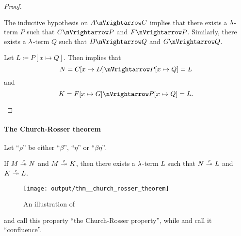 \begin{proof}
\begin{itemize}
\begin{itemize}
      The inductive hypothesis on \( A \pred C \) implies that there exists a \( \mathrm{\lambda} \)-term \( P \) such that \( C \pred P \) and \( F \pred P \). Similarly, there exists a \( \mathrm{\lambda} \)-term \( Q \) such that \( D \pred Q \) and \( G \pred Q \).

      Let \( L \coloneqq P[x \mapsto Q] \). Then  implies that
      \begin{equation*}
        N = C[x \mapsto D] \pred P[x \mapsto Q] = L
      \end{equation*}
      and
      \begin{equation*}
        K = F[x \mapsto G] \pred P[x \mapsto Q] = L.
      \end{equation*}
    \end{itemize}
  \end{itemize}
\end{proof}

\paragraph{The Church-Rosser theorem}

\begin{theorem}\label{thm:church_rosser_theorem}
  Let \enquote{\( \rho \)} be either \enquote{\( \beta \)}, \enquote{\( \eta \)} or \enquote{\( \beta\eta \)}.

  If \( M \rred* N \) and \( M \rred* K \), then there exists a \( \mathrm{\lambda} \)-term \( L \) such that \( N \rred* L \) and \( K \rred* L \).

  \begin{figure}[!ht]
    \centering
    \texttt{[image: output/thm\_\_church\_rosser\_theorem]}
    \caption{An illustration of }\label{fig:thm:church_rosser_theorem}
  \end{figure}
\end{theorem}
\begin{comments}
  \item {} and  call this property \enquote{the Church-Rosser property}, while  and  call it \enquote{confluence}.
\end{comments}
